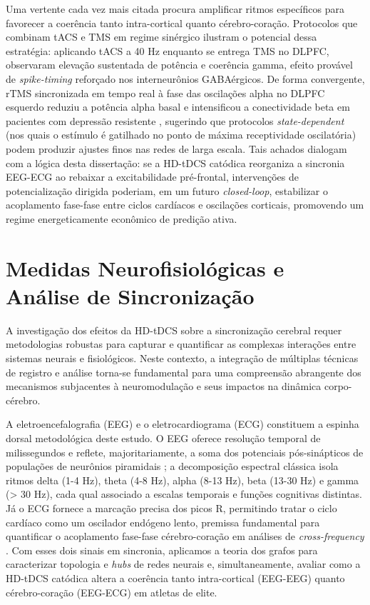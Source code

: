 Uma vertente cada vez mais citada procura amplificar ritmos específicos para favorecer a coerência tanto intra-cortical quanto cérebro-coração. Protocolos que combinam tACS e TMS em regime sinérgico ilustram o potencial dessa estratégia: aplicando tACS a 40 Hz enquanto se entrega TMS no DLPFC,  observaram elevação sustentada de potência e coerência gamma, efeito provável de \emph{spike-timing} reforçado nos interneurônios GABAérgicos. De forma convergente, rTMS sincronizada em tempo real à fase das oscilações alpha no DLPFC esquerdo reduziu a potência alpha basal e intensificou a conectividade beta em pacientes com depressão resistente \cite{zrenner2020brain}, sugerindo que protocolos \emph{state-dependent} (nos quais o estímulo é gatilhado no ponto de máxima receptividade oscilatória) podem produzir ajustes finos nas redes de larga escala. Tais achados dialogam com a lógica desta dissertação: se a HD-tDCS catódica reorganiza a sincronia EEG-ECG ao rebaixar a excitabilidade pré-frontal, intervenções de potencialização dirigida poderiam, em um futuro \emph{closed-loop}, estabilizar o acoplamento fase-fase entre ciclos cardíacos e oscilações corticais, promovendo um regime energeticamente econômico de predição ativa.


\section{Medidas Neurofisiológicas e Análise de Sincronização}
A investigação dos efeitos da HD-tDCS sobre a sincronização cerebral requer metodologias robustas para capturar e quantificar as complexas interações entre sistemas neurais e fisiológicos. Neste contexto, a integração de múltiplas técnicas de registro e análise torna-se fundamental para uma compreensão abrangente dos mecanismos subjacentes à neuromodulação e seus impactos na dinâmica corpo-cérebro.

A eletroencefalografia (EEG) e o eletrocardiograma (ECG) constituem a espinha dorsal metodológica deste estudo. O EEG oferece resolução temporal de milissegundos e reflete, majoritariamente, a soma dos potenciais pós-sinápticos de populações de neurônios piramidais \cite{cohen2017where}; a decomposição espectral clássica isola ritmos delta (1-4 Hz), theta (4-8 Hz), alpha (8-13 Hz), beta (13-30 Hz) e gamma (> 30 Hz), cada qual associado a escalas temporais e funções cognitivas distintas. Já o ECG fornece a marcação precisa dos picos R, permitindo tratar o ciclo cardíaco como um oscilador endógeno lento, premissa fundamental para quantificar o acoplamento fase-fase cérebro-coração em análises de \textit{cross-frequency} \cite{criscuolo2022cognition,park2018neural}. Com esses dois sinais em sincronia, aplicamos a teoria dos grafos para caracterizar topologia e \textit{hubs} de redes neurais \cite{bullmore2009complex} e, simultaneamente, avaliar como a HD-tDCS catódica altera a coerência tanto intra-cortical (EEG-EEG) quanto cérebro-coração (EEG-ECG) em atletas de elite.

